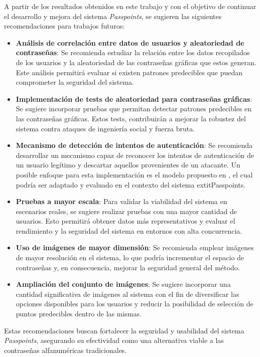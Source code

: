 \begin{recomendations}
   A partir de los resultados obtenidos en este trabajo y con el objetivo de continuar el desarrollo y mejora del sistema \textit{Passpoints}, se sugieren las siguientes recomendaciones para trabajos futuros:
   
   \begin{itemize}
   	\item 	\textbf{Análisis de correlación entre datos de usuarios y aleatoriedad de contraseñas}: Se recomienda estudiar la relación entre los datos recopilados de los usuarios y la aleatoriedad de las contraseñas gráficas que estos generan. Este análisis permitirá evaluar si existen patrones predecibles que puedan comprometer la seguridad del sistema.
   	
   	\item 	\textbf{Implementación de tests de aleatoriedad para contraseñas gráficas}: Se sugiere incorporar pruebas que permitan detectar patrones predecibles en las contraseñas gráficas. Estos tests, contribuirán a mejorar la robustez del sistema contra ataques de ingeniería social y fuerza bruta.
   	
   	\item 	\textbf{Mecanismo de detección de intentos de autenticación}: Se recomienda desarrollar un mecanismo capaz de reconocer los intentos de autenticación de un usuario legítimo y descartar aquellos provenientes de un atacante. Un posible enfoque para esta implementación es el modelo propuesto en \cite{legon2019nuevo}, el cual podría ser adaptado y evaluado en el contexto del sistema 	extit{Passpoints}.
   	
   	\item 	\textbf{Pruebas a mayor escala}: Para validar la viabilidad del sistema en escenarios reales, se sugiere realizar pruebas con una mayor cantidad de usuarios. Esto permitirá obtener datos más representativos y evaluar el rendimiento y la seguridad del sistema en entornos con alta concurrencia.
   	
   	\item 	\textbf{Uso de imágenes de mayor dimensión}: Se recomienda emplear imágenes de mayor resolución en el sistema, lo que podría incrementar el espacio de contrase\~nas y, en consecuencia, mejorar la seguridad general del método.
   	
   	\item 	\textbf{Ampliación del conjunto de imágenes}: Se sugiere incorporar una cantidad significativa de imágenes al sistema con el fin de diversificar las opciones disponibles para los usuarios y reducir la posibilidad de selección de puntos predecibles dentro de las mismas.
   	
   \end{itemize}
   
   Estas recomendaciones buscan fortalecer la seguridad y usabilidad del sistema \textit{Passpoints}, asegurando su efectividad como una alternativa viable a las contraseñas alfanuméricas tradicionales.
\end{recomendations}
